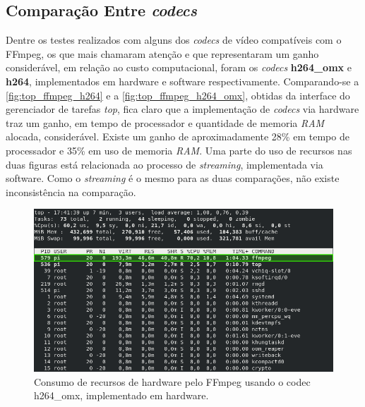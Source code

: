\subsection{Comparação Entre \textit{codecs}}
\label{subsec:compcodecs}

Dentre os testes realizados com alguns dos \textit{codecs} de vídeo compatíveis com o FFmpeg, os que mais chamaram atenção e que representaram um ganho considerável, em relação ao custo computacional, foram os \textit{codecs} \textbf{h264\_omx} e \textbf{h264}, implementados em hardware e software respectivamente.
Comparando-se a \autoref{fig:top_ffmpeg_h264} e a \autoref{fig:top_ffmpeg_h264_omx}, obtidas da interface do gerenciador de tarefas \textit{top}, fica claro que a implementação de \textit{codecs} via hardware traz um ganho, em tempo de processador e quantidade de memoria \textit{RAM} alocada, considerável. Existe um ganho de aproximadamente 28\% em tempo de processador e 35\% em uso de memoria \textit{RAM}. Uma parte do uso de recursos nas duas figuras está relacionada ao processo de \textit{streaming}, implementada via software. Como o \textit{streaming} é o mesmo para as duas comparações, não existe inconsistência na comparação.

\begin{figure}[H]
	\centering
	\includegraphics[width=1\textwidth]{figuras/top_ffmpeg_h264_omx.png}
	\caption{Consumo de recursos de hardware pelo FFmpeg usando o codec h264\_omx, implementado em hardware.}
	\label{fig:top_ffmpeg_h264_omx}
\end{figure}

